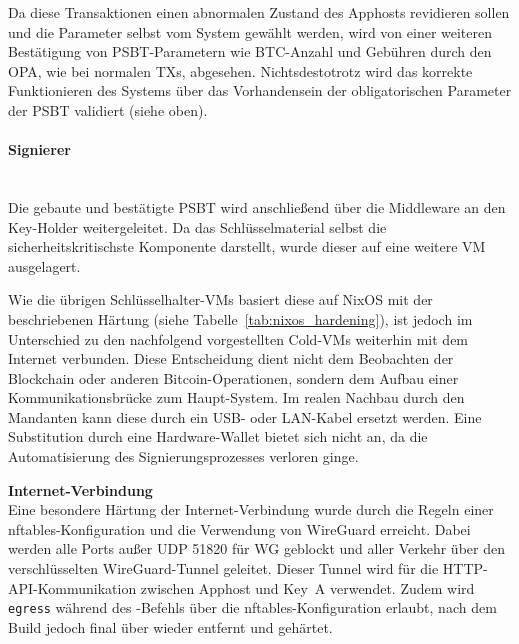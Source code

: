 Da diese Transaktionen einen abnormalen Zustand des Apphosts revidieren sollen und die Parameter selbst vom System gewählt werden, wird von einer weiteren Bestätigung von \ac{PSBT}-Parametern wie \ac{BTC}-Anzahl und Gebühren durch den \ac{OPA}, wie bei normalen \acp{TX}, abgesehen. Nichtsdestotrotz wird das korrekte Funktionieren des Systems über das Vorhandensein der obligatorischen Parameter der \ac{PSBT} validiert (siehe oben).


\paragraph{Signierer} \mbox{}\\
Die gebaute und bestätigte \ac{PSBT} wird anschließend über die Middleware an den Key-Holder weitergeleitet.
Da das Schlüsselmaterial selbst die sicherheitskritischste Komponente darstellt, wurde dieser auf eine weitere \ac{VM} ausgelagert.

Wie die übrigen Schlüsselhalter-\acp{VM} basiert diese auf NixOS mit der beschriebenen Härtung (siehe Tabelle~\ref{tab:nixos_hardening}), ist jedoch im Unterschied zu den nachfolgend vorgestellten Cold-\acp{VM} weiterhin mit dem Internet verbunden.
Diese Entscheidung dient nicht dem Beobachten der Blockchain oder anderen Bitcoin-Operationen, sondern dem Aufbau einer Kommunikationsbrücke zum Haupt-System. Im realen Nachbau durch den Mandanten kann diese durch ein \ac{USB}- oder \ac{LAN}-Kabel ersetzt werden. Eine Substitution durch eine Hardware-Wallet bietet sich nicht an, da die Automatisierung des Signierungsprozesses verloren ginge.

\textbf{Internet-Verbindung} \\
Eine besondere Härtung der Internet-Verbindung wurde durch die Regeln einer nftables-Konfiguration und die Verwendung von WireGuard erreicht. Dabei werden alle Ports außer \ac{UDP} 51820 für \ac{WG} geblockt und aller Verkehr über den verschlüsselten WireGuard-Tunnel geleitet. Dieser Tunnel wird für die \ac{HTTP}-\ac{API}-Kommunikation zwischen Apphost und Key~A verwendet.
Zudem wird \texttt{egress} während des \texttt{}-Befehls über die nftables-Konfiguration \texttt{} erlaubt, nach dem Build jedoch final über \texttt{} wieder entfernt und gehärtet.

